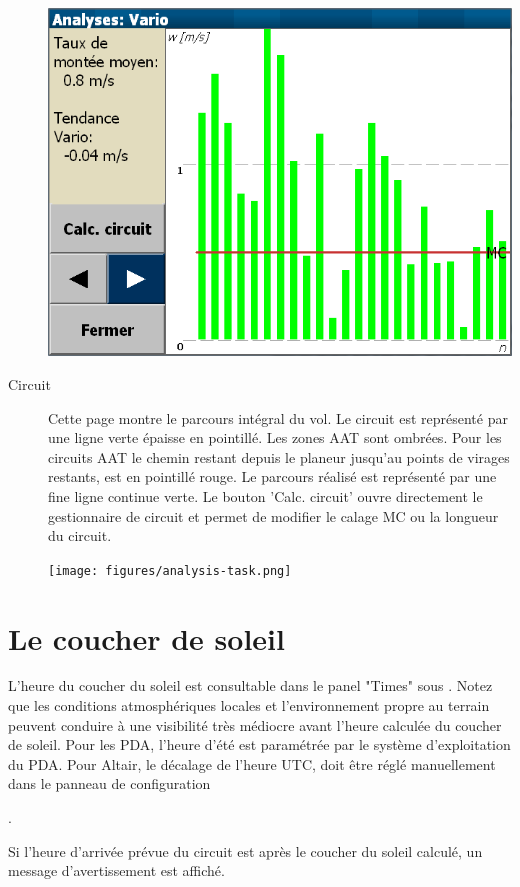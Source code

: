 \begin{description}
\begin{center}
\includegraphics[angle=0,width=0.8\linewidth,keepaspectratio='true']{figures/analysis-climb.png}
\end{center}

\item[Circuit]
Cette page montre le parcours intégral du vol. Le circuit est représenté par une ligne verte épaisse en pointillé. Les zones AAT sont ombrées. Pour les circuits AAT le chemin restant depuis le planeur jusqu'au points de virages restants, est en pointillé rouge. Le parcours réalisé est représenté par une fine ligne continue verte.
  Le bouton 'Calc. circuit' ouvre directement le gestionnaire de circuit et permet de modifier le calage MC ou la longueur du circuit.

\begin{center}
\texttt{[image: figures/analysis-task.png]}
\end{center}

\end{description}

\section{Le coucher de soleil}

L'heure du coucher du soleil est consultable dans le panel "Times"  sous \blink{}. Notez que les conditions atmosphériques locales et l'environnement propre au terrain peuvent conduire à une visibilité très médiocre avant l'heure calculée du coucher de soleil.
Pour les PDA, l'heure d'été est paramétrée par le système d'exploitation du PDA. Pour Altair, le décalage de l'heure UTC, doit être réglé manuellement dans le panneau de configuration

 \blink{}\blink{}\blink{}.

Si l'heure d'arrivée prévue du circuit est après le coucher du soleil calculé, un message d'avertissement est affiché. 

